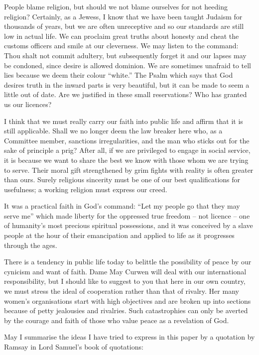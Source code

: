 People blame religion, but should we not blame
ourselves for not heeding religion? Certainly, as a
Jewess, I know that we have been taught Judaism for
thousands of years, but we are often unreceptive and so our
standards are still low in actual life. We can proclaim
great truths about honesty and cheat the customs officers
and smile at our cleverness. We may listen to the command:
Thou shalt not commit adultery, but subsequently forget it
and our lapses may be condoned, since desire is allowed
dominion. We are sometimes unafraid to tell lies because
we deem their colour ``white.'' The Psalm which says that
God desires truth in the inward parts is very beautiful,
but it can be made to seem a little out of date. Are we
justified in these small reservations? Who has granted us
our licences?

I think that we must really carry our faith into
public life and affirm that it is still applicable. Shall
we no longer deem the law breaker here who, as a Committee
member, sanctions irregularities, and the man who sticks
out for the sake of principle a prig? After all, if we are
privileged to engage in social service, it is because we
want to share the best we know with those whom we are
trying to serve. Their moral gift strengthened by grim
fights with reality is often greater than ours. Surely
religious sincerity must be one of our best qualifications
for usefulness; a working religion must express our creed.

It was a practical faith in God's command: ``Let my
people go that they may serve me'' which made liberty for
the oppressed true freedom -- not licence -- one of
humanity's most precious spiritual possessions, and it was
conceived by a slave people at the hour of their emancipation
and applied to life as it progresses through the ages.

There is a tendency in public life today to belittle
the possibility of peace by our cynicism and want of faith.
Dame May Curwen will deal with our international
responsibility, but I should like to suggest to you that here in
our own country, we must stress the ideal of cooperation
rather than that of rivalry. Her many women's
organisations start with high objectives and are broken up into
sections because of petty jealousies and rivalries. Such
catastrophies can only be averted by the courage and faith
of those who value peace as a revelation of God.

May I summarise the ideas I have tried to express in
this paper by a quotation by Ramsay in Lord Samuel's book
of quotations:

